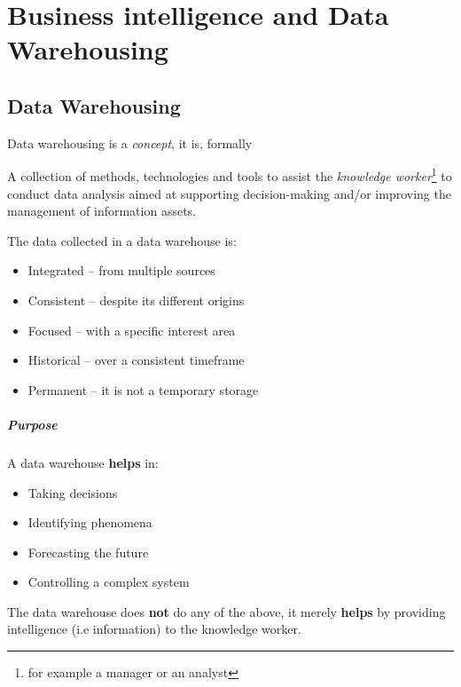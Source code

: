 \documentclass[openright, twoside, twocolumn]{report}
\begin{document}

\chapter{Business intelligence and Data Warehousing}

\section{Data Warehousing}

Data warehousing is a \emph{concept}, it is, formally

\begin{definition}
  A collection of methods, technologies and tools to
  assist the \emph{knowledge worker}\footnote{
    for example a manager or an analyst
  } to conduct data analysis aimed at supporting
  decision-making and/or improving the management of
  information assets.
\end{definition}

The data collected in a data warehouse is:

\begin{itemize}
  \item Integrated -- from multiple sources
  \item Consistent -- despite its different origins
  \item Focused -- with a specific interest area
  \item Historical -- over a consistent timeframe
  \item Permanent -- it is not a temporary storage
\end{itemize}

\paragraph{Purpose}
A data warehouse \textbf{helps} in:

\begin{itemize}
  \item Taking decisions
  \item Identifying phenomena
  \item Forecasting the future
  \item Controlling a complex system
\end{itemize}

\begin{remark}
  The data warehouse does \textbf{not} do any of the above, it merely
  \textbf{helps} by providing intelligence (i.e information) to the
  knowledge worker.
\end{remark}
\end{document}
